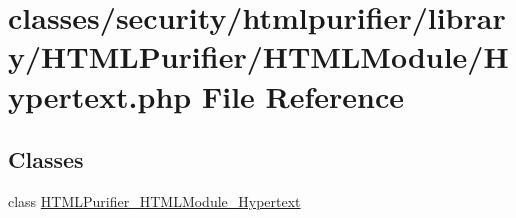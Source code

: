 \hypertarget{Hypertext_8php}{\section{classes/security/htmlpurifier/library/\+H\+T\+M\+L\+Purifier/\+H\+T\+M\+L\+Module/\+Hypertext.php File Reference}
\label{Hypertext_8php}
}
\subsection*{Classes}
\begin{DoxyCompactItemize}
\item 
class \hyperlink{classHTMLPurifier__HTMLModule__Hypertext}{H\+T\+M\+L\+Purifier\+\_\+\+H\+T\+M\+L\+Module\+\_\+\+Hypertext}
\end{DoxyCompactItemize}
